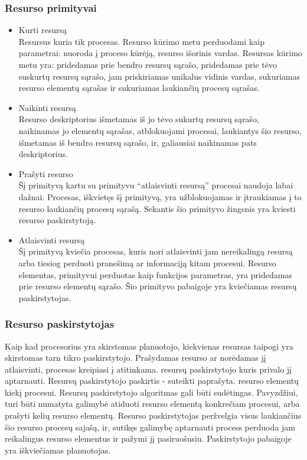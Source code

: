 \subsubsection{Resurso primityvai}
	\begin{itemize}
		\item Kurti resursą \\ Resursus kuria tik procesas. Resurso kūrimo metu perduodami kaip parametrai: nuoroda į proceso kūrėją, resurso išorinis vardas. Resursas kūrimo metu yra: pridedamas prie bendro resursų sąrašo, pridedamas prie tėvo suskurtų resursų sąrašo, jam priskiriamas unikalus vidinis vardas, sukuriamas resurso elementų sąrašas ir sukuriamas laukiančių procesų sąrašas.
		\item Naikinti resursą \\ Resurso deskriptorius išmetamas iš jo tėvo sukurtų resursų sąrašo, naikinamas jo elementų sąrašas, atblokuojami procesai, laukiantys šio resurso, išmetamas iš bendro resursų sąrašo, ir, galiausiai naikinamas pats deskriptorius. 
		\item Prašyti resurso \\Šį primityvą kartu su primityvu “atlaisvinti resursą” procesai naudoja labai dažnai. Procesas, iškvietęs šį primityvą, yra užblokuojamas ir įtraukiamas į to resurso laukiančių procesų sąrašą. Sekantis šio primityvo žingsnis yra kviesti resurso paskirstytoją.
		\item Atlaisvinti resursą \\Šį primityvą kviečia procesas, kuris nori atlaisvinti jam nereikalingą resursą arba tiesiog perduoti pranešimą ar informaciją kitam procesui. Resurso elementas, primityvui perduotas kaip funkcijos parametras, yra pridedamas prie resurso elementų sąrašo. Šio primityvo pabaigoje yra kviečiamas resursų paskirstytojas.
	\end{itemize}

\subsubsection{Resurso paskirstytojas}
Kaip kad procesorius yra skirstomas planuotojo, kiekvienas resursas taipogi yra skirstomas tarn tikro paskirstytojo. Prašydamas resurso ar norėdamas jį atlaisvinti, procesas kreipiasi į atitinkama. resursų paskirstytojo kuris privalo jį aptarnauti.
Resursų paskirstytojo paskirtis - suteikti paprašyta. resurso elementų kiekį procesui. Resursų paskirstytojo algoritmas gali būti sudėtingas. Pavyzdžiui, turi būti numatyta galimybė atiduoti resurso elementą konkrečiam procesui, arba prašyti kelių resurso elementų. Resurso paskirstytojas peržvelgia visus laukiančius šio resurso procesų sajašą, ir, sutikęs galimybę aptarnauti process perduoda jam reikalingus resurso elementus ir pažymi jį pasiruošusiu. Paskirstytojo pabaigoje yra iškviečiamas planuotojas.


